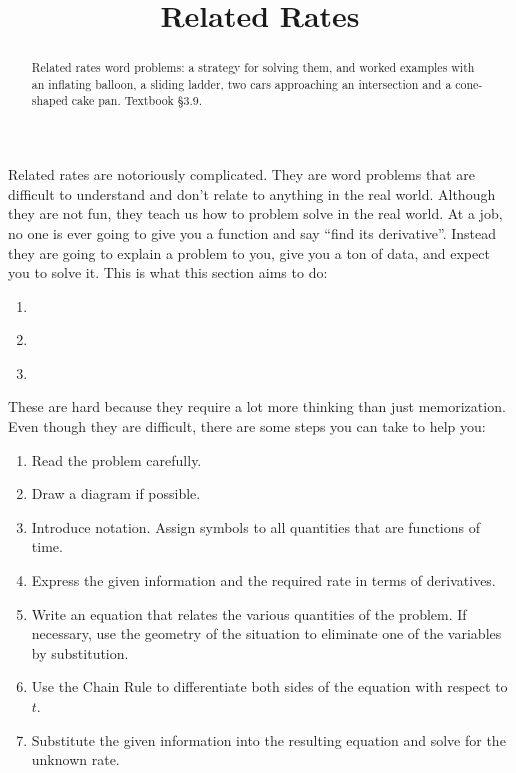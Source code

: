 \documentclass{ximera}
\title{Related Rates}
\begin{document}
\begin{abstract}
Related rates word problems: a strategy for solving them, and worked examples with an inflating balloon, a sliding ladder, two cars approaching an intersection and a cone-shaped cake pan. Textbook §3.9.
\end{abstract}
\maketitle

Related rates are notoriously complicated. They are word problems that are difficult to understand and don't relate to anything in the real world. Although they are not fun, they teach us how to problem solve in the real world. At a job, no one is ever going to give you a function and say ``find its derivative''. Instead they are going to explain a problem to you, give you a ton of data, and expect you to solve it. This is what this section aims to do:

\begin{enumerate}
  \item \begin{freeResponse}\end{freeResponse}
  \item \begin{freeResponse}\end{freeResponse}
  \item \begin{freeResponse}\end{freeResponse}
\end{enumerate}

These are hard because they require a lot more thinking than just memorization. Even though they are difficult, there are some steps you can take to help you:

\begin{enumerate}
  \item Read the problem carefully.
  \item Draw a diagram if possible.
  \item Introduce notation. Assign symbols to all quantities that are functions of time.
  \item Express the given information and the required rate in terms of derivatives.
  \item Write an equation that relates the various quantities of the problem. If necessary, use the geometry of the situation to eliminate one of the variables by substitution.
  \item Use the Chain Rule to differentiate both sides of the equation with respect to $t$.
  \item Substitute the given information into the resulting equation and solve for the unknown rate.
\end{enumerate}
\end{document}
